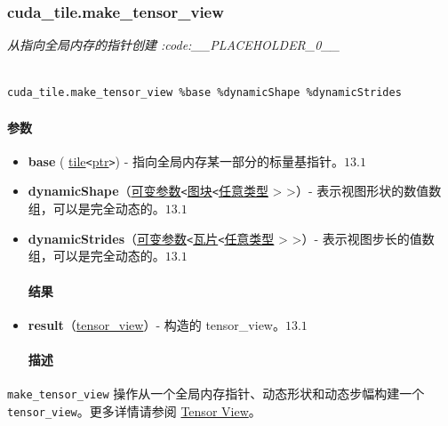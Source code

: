 \documentclass{article}
\begin{document}
\subsubsection{cuda\_tile.make\_tensor\_view}


\textit{从指向全局内存的指针创建 :code:\_\_PLACEHOLDER\_0\_\_}



\begin{lstlisting}

cuda_tile.make_tensor_view %base %dynamicShape %dynamicStrides

\end{lstlisting}



\paragraph{参数}


\begin{itemize}
\item \textbf{base} ( \href{https://docs.nvidia.com/cuda/tile-ir/latest/sections/types.html#type-tile}{tile}\texttt{<}\href{https://docs.nvidia.com/cuda/tile-ir/latest/sections/types.html#type-ptr}{ptr}\texttt{>}) - 指向全局内存某一部分的标量基指针。$\boxed{13.1}$
\item \textbf{dynamicShape}（\href{https://docs.nvidia.com/cuda/tile-ir/latest/sections/operations.html#type-variadic}{可变参数}\texttt{<}\href{https://docs.nvidia.com/cuda/tile-ir/latest/sections/types.html#type-tile}{图块}\texttt{<}\href{https://docs.nvidia.com/cuda/tile-ir/latest/sections/operations.html#type-any}{任意类型} > >）- 表示视图形状的数值数组，可以是完全动态的。$\boxed{13.1}$
\item \textbf{dynamicStrides}（\href{https://docs.nvidia.com/cuda/tile-ir/latest/sections/operations.html#type-variadic}{可变参数}\texttt{<}\href{https://docs.nvidia.com/cuda/tile-ir/latest/sections/types.html#type-tile}{瓦片}\texttt{<}\href{https://docs.nvidia.com/cuda/tile-ir/latest/sections/operations.html#type-any}{任意类型} > >）- 表示视图步长的值数组，可以是完全动态的。$\boxed{13.1}$




\paragraph{结果}


\item \textbf{result}（\href{https://docs.nvidia.com/cuda/tile-ir/latest/sections/types.html#type-tensor-view}{tensor\_view}）- 构造的 tensor\_view。$\boxed{13.1}$




\paragraph{描述}


\end{itemize}
\texttt{make\_tensor\_view} 操作从一个全局内存指针、动态形状和动态步幅构建一个 \texttt{tensor\_view}。更多详情请参阅 \href{https://docs.nvidia.com/cuda/tile-ir/latest/sections/types.html#type-tensor-view}{Tensor View}。
\end{document}
